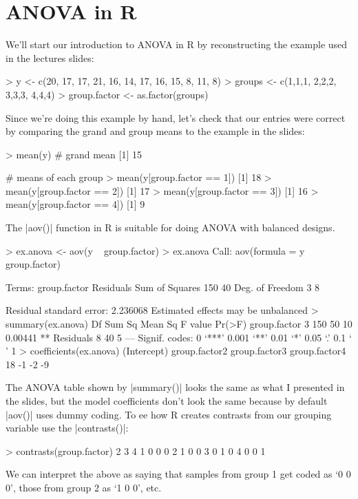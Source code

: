 
\section{ANOVA in R}

We'll start our introduction to ANOVA in R by reconstructing the example used in the lectures slides:

\begin{R}
> y <- c(20, 17, 17, 21, 16, 14, 17, 16, 15, 8, 11, 8)
> groups <- c(1,1,1, 2,2,2, 3,3,3, 4,4,4)
> group.factor <- as.factor(groups)
\end{R}
%
Since we're doing this example by hand, let's check that our entries were correct by comparing the grand and group means to the example in the slides:
%
\begin{R}
> mean(y)  # grand mean
[1] 15

# means of each group
> mean(y[group.factor == 1])
[1] 18
> mean(y[group.factor == 2])
[1] 17
> mean(y[group.factor == 3])
[1] 16
> mean(y[group.factor == 4])
[1] 9
\end{R}

The |aov()| function in R is suitable for doing ANOVA with balanced designs.
\begin{R}
> ex.anova <- aov(y ~ group.factor)
> ex.anova
Call:
   aov(formula = y ~ group.factor)

Terms:
                group.factor Residuals
Sum of Squares           150        40
Deg. of Freedom            3         8

Residual standard error: 2.236068 
Estimated effects may be unbalanced
> summary(ex.anova)
             Df Sum Sq Mean Sq F value  Pr(>F)   
group.factor  3    150      50      10 0.00441 **
Residuals     8     40       5                   
---
Signif. codes:  0 ‘***’ 0.001 ‘**’ 0.01 ‘*’ 0.05 ‘.’ 0.1 ‘ ’ 1   
> coefficients(ex.anova)
  (Intercept) group.factor2 group.factor3 group.factor4 
           18            -1            -2            -9 
\end{R}

The ANOVA table shown by |summary()| looks the same as what I presented in the slides, but the model coefficients don't look the same because by default |aov()| uses dummy coding. To ee how R creates contrasts from our grouping variable use the |contrasts()|:
\begin{R}
> contrasts(group.factor)
  2 3 4
1 0 0 0
2 1 0 0
3 0 1 0
4 0 0 1
\end{R}
%
We can interpret the above as saying that samples from group 1 get coded as `0 0 0', those from group 2 as `1 0 0', etc.

